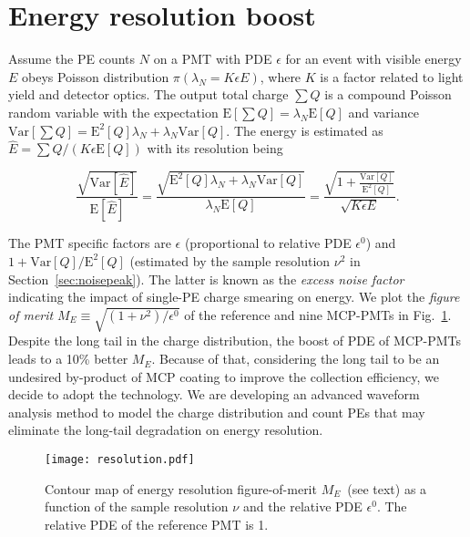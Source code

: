 \section{Energy resolution boost}
\label{Result}
Assume the PE counts $N$ on a PMT with PDE $\epsilon$ for an event with visible energy $E$ obeys Poisson distribution $\pi(\lambda_N=K\epsilon E)$, where $K$ is a factor related to light yield and detector optics. The output total charge $\sum{Q}$ is a compound Poisson random variable with the expectation $\mathrm{E}[\sum{Q}]=\lambda_N\mathrm{E}[Q]$ and variance $\mathrm{Var}[\sum{Q}]=\mathrm{E}^2[Q]\lambda_N+\lambda_N\mathrm{Var}[Q]$. The energy is estimated as $\hat{E}=\sum{Q}/(K\epsilon\mathrm{E}[Q])$ with its resolution being

\begin{equation}
    \frac{\sqrt{\mathrm{Var}[\hat{E}]}}{\mathrm{E}[\hat{E}]}=\frac{\sqrt{\mathrm{E}^2[Q]\lambda_N+\lambda_N\mathrm{Var}[Q]}}{\lambda_N\mathrm{E}[Q]}=\frac{\sqrt{1+\frac{\mathrm{Var}[Q]}{\mathrm{E}^2[Q]}}}{\sqrt{K\epsilon E}}.
\end{equation}

The PMT specific factors are $\epsilon$ (proportional to relative PDE $\epsilon^0$) and \(1 + \mathrm{Var}[Q]/ \mathrm{E}^2[Q]\) (estimated by the sample resolution $\nu^2$ in Section~\ref{sec:noisepeak}).  The latter is known as the \emph{excess noise factor}~\cite{JUNOMassTesting,ENF,ENFAuger} indicating the impact of single-PE charge smearing on energy.  We plot the \emph{figure of merit} $M_{E}\equiv\sqrt{({1+\nu^2})/{\epsilon^0}}$ of the reference and nine MCP-PMTs in Fig.~\ref{fig:EnergyResolution}. Despite the long tail in the charge distribution, the boost of PDE of MCP-PMTs leads to a 10\% better $M_{E}$.  Because of that, considering the long tail to be an undesired by-product of MCP coating to improve the collection efficiency, we decide to adopt the technology.  We are developing an advanced waveform analysis method to model the charge distribution and count PEs that may eliminate the long-tail degradation on energy resolution.

\begin{figure}[!htbp]
    \centering
    \texttt{[image: resolution.pdf]}
    \caption{Contour map of energy resolution figure-of-merit $M_{E}$~(see text) as a function of the sample resolution $\nu$ and the relative PDE $\epsilon^0$. The relative PDE of the reference PMT is 1.}
    \label{fig:EnergyResolution}
\end{figure}
